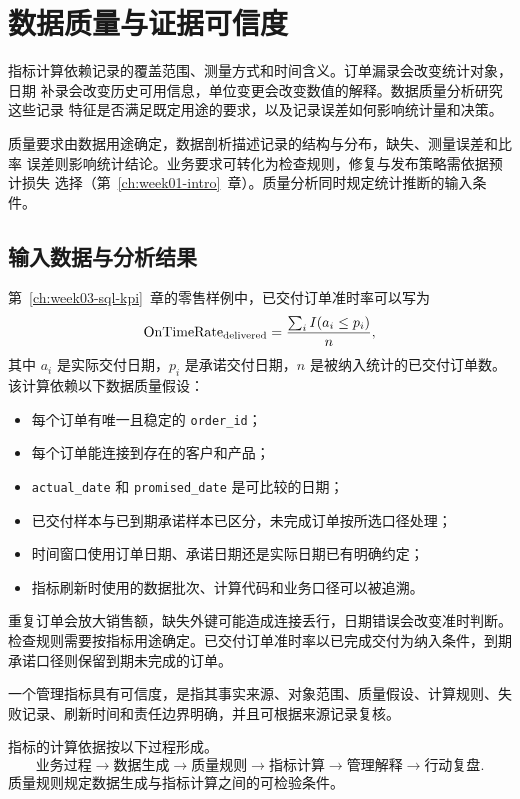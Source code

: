 \chapter{数据质量与证据可信度}
\label{ch:week04-data-quality}

指标计算依赖记录的覆盖范围、测量方式和时间含义。订单漏录会改变统计对象，日期
补录会改变历史可用信息，单位变更会改变数值的解释。数据质量分析研究这些记录
特征是否满足既定用途的要求，以及记录误差如何影响统计量和决策。

质量要求由数据用途确定，数据剖析描述记录的结构与分布，缺失、测量误差和比率
误差则影响统计结论。业务要求可转化为检查规则，修复与发布策略需依据预计损失
选择（第~\ref{ch:week01-intro}~章）。质量分析同时规定统计推断的输入条件。

\section{输入数据与分析结果}

第~\ref{ch:week03-sql-kpi}~章的零售样例中，已交付订单准时率可以写为
\[
\mathrm{OnTimeRate}_{\rm delivered}
=
\frac{\sum_i I(a_i\le p_i)}{n},
\]
其中 \(a_i\) 是实际交付日期，\(p_i\) 是承诺交付日期，\(n\) 是被纳入统计的已交付订单数。该计算依赖以下数据质量假设：
\begin{itemize}
  \item 每个订单有唯一且稳定的 \texttt{order\_id}；
  \item 每个订单能连接到存在的客户和产品；
  \item \texttt{actual\_date} 和 \texttt{promised\_date} 是可比较的日期；
  \item 已交付样本与已到期承诺样本已区分，未完成订单按所选口径处理；
  \item 时间窗口使用订单日期、承诺日期还是实际日期已有明确约定；
  \item 指标刷新时使用的数据批次、计算代码和业务口径可以被追溯。
\end{itemize}

重复订单会放大销售额，缺失外键可能造成连接丢行，日期错误会改变准时判断。检查规则需要按指标用途确定。已交付订单准时率以已完成交付为纳入条件，到期承诺口径则保留到期未完成的订单。

\begin{definition}[指标可信度]
一个管理指标具有可信度，是指其事实来源、对象范围、质量假设、计算规则、失败记录、刷新时间和责任边界明确，并且可根据来源记录复核。
\end{definition}

指标的计算依据按以下过程形成。
\[
\text{业务过程}
\rightarrow
\text{数据生成}
\rightarrow
\text{质量规则}
\rightarrow
\text{指标计算}
\rightarrow
\text{管理解释}
\rightarrow
\text{行动复盘}.
\]
质量规则规定数据生成与指标计算之间的可检验条件。

